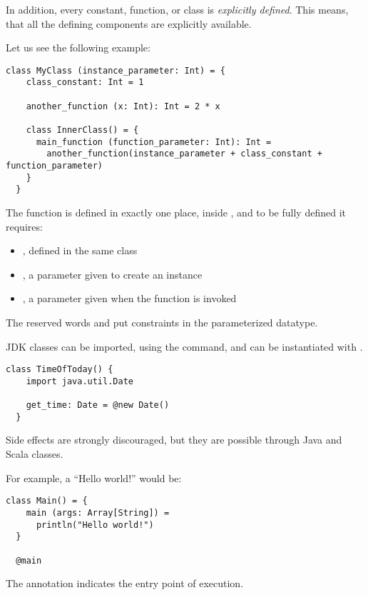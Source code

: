 In addition, every constant, function, or class is \emph{explicitly defined}.
This means, that all the defining components are explicitly available.

Let us see the following example:
\begin{lstlisting}[label={lst:exampleExplicitDefinition}]
  class MyClass (instance_parameter: Int) = {
    class_constant: Int = 1

    another_function (x: Int): Int = 2 * x

    class InnerClass() = {
      main_function (function_parameter: Int): Int =
        another_function(instance_parameter + class_constant + function_parameter)
    }
  }
\end{lstlisting}

The function  is defined in exactly one place, inside , and to be fully defined it requires:
\begin{itemize}
    \item {}, defined in the same class
    \item {}, a parameter given to create an instance
    \item {}, a parameter given when the function is invoked
\end{itemize}

The reserved words \ssubtype and \ssupertype put constraints in the parameterized datatype.

JDK classes can be imported, using the \simport command, and can be instantiated with \snew.

\begin{lstlisting}[label={lst:exampleJDKImport}]
  class TimeOfToday() {
    import java.util.Date

    get_time: Date = @new Date()
  }
\end{lstlisting}

Side effects are strongly discouraged, but they are possible through Java and Scala classes.

For example, a ``Hello world!'' would be:
\begin{lstlisting}[label={lst:exampleHelloWorld}]
  class Main() = {
    main (args: Array[String]) =
      println("Hello world!")
  }

  @main
\end{lstlisting}

The \smain annotation indicates the entry point of execution.

